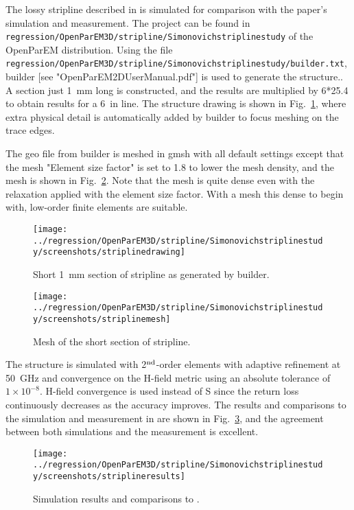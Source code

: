 \documentclass[titlepage]{article}
\renewcommand\_{\textunderscore\linebreak[1]}
\begin{document}
The lossy stripline described in \cite{Simonovich} is simulated for comparison with the paper's simulation and measurement.
The project can be found in \texttt{regression/OpenParEM3D/stripline/Simonovich\_stripline\_study} of the OpenParEM distribution.
Using the file \texttt{regression/OpenParEM3D/stripline/Simonovich\_stripline\_study/builder.txt}, builder [see "OpenParEM2D\_User\_Manual.pdf"] is used to generate the structure..
A section just 1~mm long is constructed, and the results are multiplied by 6*25.4 to obtain results for a 6~in line.
The structure drawing is shown in Fig.~\ref{fig:stripline_drawing}, where extra physical detail is automatically added by builder to focus meshing on the trace edges.

The geo file from builder is meshed in gmsh with all default settings except that the mesh "Element size factor" is set to 1.8 to lower the mesh density, and the mesh is shown in Fig.~\ref{fig:stripline_mesh}.  Note that the mesh is quite dense even with the relaxation applied with the element size factor.  With a mesh this dense to begin with, low-order finite elements are suitable.

\begin{figure}[H]
  \centering
  \texttt{[image: ../regression/OpenParEM3D/stripline/Simonovich\_stripline\_study/screenshots/stripline\_drawing]}
  \caption{Short 1~mm section of stripline as generated by builder.}
  \label{fig:stripline_drawing}
\end{figure}

\begin{figure}[H]
  \centering
  \texttt{[image: ../regression/OpenParEM3D/stripline/Simonovich\_stripline\_study/screenshots/stripline\_mesh]}
  \caption{Mesh of the short section of stripline.}
  \label{fig:stripline_mesh}
\end{figure}

The structure is simulated with 2$^{\textnormal{nd}}$-order elements with adaptive refinement at 50~GHz and convergence on the H-field metric using an absolute tolerance of $1\!\!\times\!\!10^{-8}$.  H-field convergence is used instead of S since the return loss continuously decreases as the accuracy improves.  The results and comparisons to the simulation and measurement in \cite{Simonovich} are shown in Fig.~\ref{fig:stripline_results}, and the agreement between both simulations and the measurement is excellent.

\begin{figure}[H]
  \centering
  \texttt{[image: ../regression/OpenParEM3D/stripline/Simonovich\_stripline\_study/screenshots/stripline\_results]}
  \caption{Simulation results and comparisons to \cite{Simonovich}.}
  \label{fig:stripline_results}
\end{figure}
\end{document}
